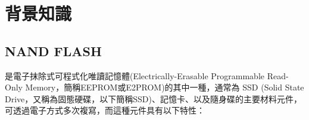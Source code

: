 \chapter{背景知識}

\section{NAND FLASH}
\indent
是電子抹除式可程式化唯讀記憶體(Electrically-Erasable Programmable Read-Only Memory，簡稱EEPROM或E2PROM)的其中一種，通常為 SSD (Solid State Drive，又稱為固態硬碟，以下簡稱SSD)、記憶卡、以及隨身碟的主要材料元件，可透過電子方式多次複寫，而這種元件具有以下特性：
\subsection*{}



%

